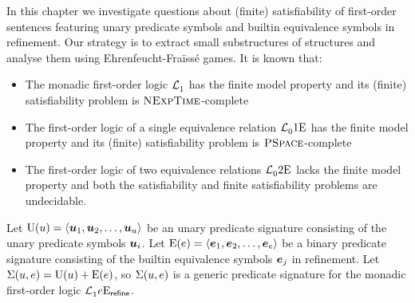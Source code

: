 
In this chapter we investigate questions about (finite) satisfiability of
first-order sentences featuring unary predicate symbols and builtin equivalence
symbols in refinement.
Our strategy is to extract small substructures of structures and analyse them
using Ehrenfeucht-Fra\"{i}ss\'{e} games.
It is known that:
\begin{itemize}
  \item The monadic first-order logic $\mathcal{L}^{{}}_{1}$ has the finite model
  property and its (finite) satisfiability problem is $\text{\normalfont{\scshape NExpTime}}$-complete
  \item The first-order logic of a single equivalence relation
  $\mathcal{L}^{{}}_{0}{1}\mathrm{E}_{{}}$ has the finite model property and its (finite)
  satisfiability problem is $\text{\normalfont{\scshape PSpace}}$-complete
  \item The first-order logic of two equivalence relations
  $\mathcal{L}^{{}}_{0}{2}\mathrm{E}_{{}}$ lacks the finite model property and both the
  satisfiability and finite satisfiability problems are undecidable.
\end{itemize}
Let $\mathrm{U}(u) = \left\langle \bm{u}_{1},\bm{u}_{2},\dots,\bm{u}_{u} \right\rangle$ be an unary predicate
signature consisting of the unary predicate symbols $\bm{u}_{i}$.
Let $\mathrm{E}(e) = \left\langle \bm{e}_{1},\bm{e}_{2},\dots,\bm{e}_{e} \right\rangle$ be a binary predicate
signature consisting of the builtin equivalence symbols $\bm{e}_{j}$ in refinement.
Let $\mathrm{\Sigma}(u,e) = \mathrm{U}(u) + \mathrm{E}(e)$, so $\mathrm{\Sigma}(u,e)$ is a generic
predicate signature for the monadic first-order logic
$\mathcal{L}^{{}}_{1}{e}\mathrm{E}_{\mathsf{refine}}$.